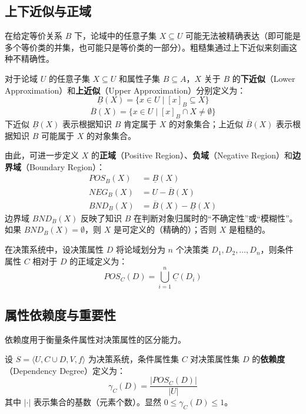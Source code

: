 \subsection{上下近似与正域}

在给定等价关系 \(B\) 下，论域中的任意子集 \(X \subseteq U\) 可能无法被精确表达（即可能是多个等价类的并集，也可能只是等价类的一部分）。粗糙集通过上下近似来刻画这种不精确性。

\begin{definition}[上下近似]
	对于论域 \(U\) 的任意子集 \(X \subseteq U\) 和属性子集 \(B \subseteq A\)，\(X\) 关于 \(B\) 的\textbf{下近似}（Lower Approximation）和\textbf{上近似}（Upper Approximation）分别定义为：
	\begin{equation}
		\underline{B}(X) = \{ x \in U \mid [x]_B \subseteq X \}
	\end{equation}
	\begin{equation}
		\overline{B}(X) = \{ x \in U \mid [x]_B \cap X \neq \emptyset \}
	\end{equation}
	下近似 \(\underline{B}(X)\) 表示根据知识 \(B\) 肯定属于 \(X\) 的对象集合；上近似 \(\overline{B}(X)\) 表示根据知识 \(B\) 可能属于 \(X\) 的对象集合。
\end{definition}

由此，可进一步定义 \(X\) 的\textbf{正域}（Positive Region）、\textbf{负域}（Negative Region）和\textbf{边界域}（Boundary Region）：
\begin{align}
	POS_B(X) &= \underline{B}(X) \\
	NEG_B(X) &= U - \overline{B}(X) \\
	BND_B(X) &= \overline{B}(X) - \underline{B}(X)
\end{align}
边界域 \(BND_B(X)\) 反映了知识 \(B\) 在判断对象归属时的“不确定性”或“模糊性”。如果 \(BND_B(X) = \emptyset\)，则 \(X\) 是可定义的（精确的）；否则 \(X\) 是粗糙的。

在决策系统中，设决策属性 \(D\) 将论域划分为 \(n\) 个决策类 \(D_1, D_2, \dots, D_n\)，则条件属性 \(C\) 相对于 \(D\) 的正域定义为：
\begin{equation}
	POS_C(D) = \bigcup_{i=1}^{n} \underline{C}(D_i)
\end{equation}

\subsection{属性依赖度与重要性}

依赖度用于衡量条件属性对决策属性的区分能力。

\begin{definition}[依赖度]
	设 \(S = \langle U, C \cup D, V, f \rangle\) 为决策系统，条件属性集 \(C\) 对决策属性集 \(D\) 的\textbf{依赖度}（Dependency Degree）定义为：
	\begin{equation}
		\gamma_C(D) = \frac{|POS_C(D)|}{|U|}
	\end{equation}
	其中 \(|\cdot|\) 表示集合的基数（元素个数）。显然 \(0 \le \gamma_C(D) \le 1\)。
\end{definition}

